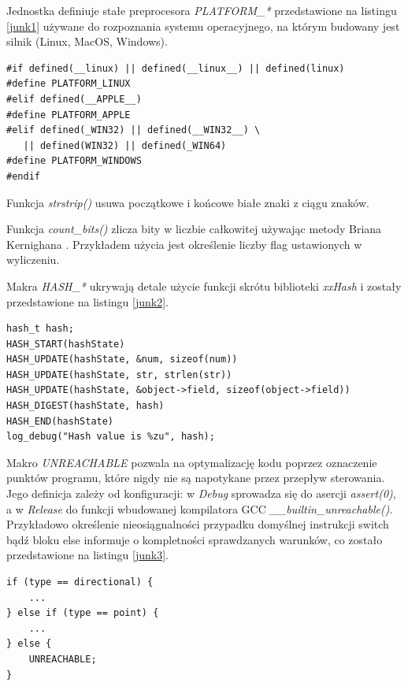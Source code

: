 Jednostka definiuje stałe preprocesora \textit{PLATFORM\_*} przedstawione na listingu \ref{junk1} używane do rozpoznania systemu operacyjnego, na którym budowany jest silnik (Linux, MacOS, Windows).
\lstset{language=C}
\begin{lstlisting}[caption={Stałe preprocesora używane do rozpoznania systemu operacyjnego},captionpos=b,label={junk1}]
#if defined(__linux) || defined(__linux__) || defined(linux)
#define PLATFORM_LINUX
#elif defined(__APPLE__)
#define PLATFORM_APPLE
#elif defined(_WIN32) || defined(__WIN32__) \
   || defined(WIN32) || defined(_WIN64)
#define PLATFORM_WINDOWS
#endif
\end{lstlisting}

Funkcja \textit{strstrip()} usuwa początkowe i końcowe białe znaki z ciągu znaków.

Funkcja \textit{count\_bits()} zlicza bity w liczbie całkowitej używając metody Briana Kernighana \cite{BITTWIDDLINGHACKS}. Przykładem użycia jest określenie liczby flag ustawionych w wyliczeniu.

Makra \textit{HASH\_*} ukrywają detale użycie funkcji skrótu biblioteki \textit{xxHash} i zostały przedstawione na listingu \ref{junk2}.
\lstset{language=C}
\begin{lstlisting}[caption={Przykład użycia funkcji skrótu},captionpos=b,label={junk2}]
hash_t hash;
HASH_START(hashState)
HASH_UPDATE(hashState, &num, sizeof(num))
HASH_UPDATE(hashState, str, strlen(str))
HASH_UPDATE(hashState, &object->field, sizeof(object->field))
HASH_DIGEST(hashState, hash)
HASH_END(hashState)
log_debug("Hash value is %zu", hash);
\end{lstlisting}

Makro \textit{UNREACHABLE} pozwala na optymalizację kodu poprzez oznaczenie punktów programu, które nigdy nie są napotykane przez przepływ sterowania.
Jego definicja zależy od konfiguracji: w \textit{Debug} sprowadza się do asercji \textit{assert(0)}, a w \textit{Release} do funkcji wbudowanej kompilatora GCC \textit{\_\_builtin\_unreachable()}.
Przykładowo określenie nieosiągnalności przypadku domyślnej instrukcji switch bądź bloku else informuje o
kompletności sprawdzanych warunków, co zostało przedstawione na listingu \ref{junk3}.
\lstset{language=C}
\begin{lstlisting}[caption={Przykład użycia makra UNREACHABLE},captionpos=b,label={junk3}]
if (type == directional) {
	...
} else if (type == point) {
	...
} else {
	UNREACHABLE;
}
\end{lstlisting}

